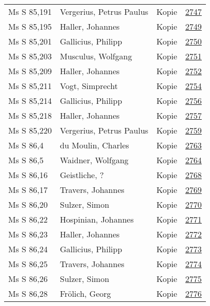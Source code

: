 \documentclass[10pt,a4paper,landscape]{report}
\begin{document}
\begin{longtable}{p{16cm}p{4cm}lr}
Ms S 85,191	&	Vergerius, Petrus Paulus	&	Kopie	&	\href{http://130.60.24.72/assignment/2747}{2747}\\
Ms S 85,195	&	Haller, Johannes	&	Kopie	&	\href{http://130.60.24.72/assignment/2749}{2749}\\
Ms S 85,201	&	Gallicius, Philipp	&	Kopie	&	\href{http://130.60.24.72/assignment/2750}{2750}\\
Ms S 85,203	&	Musculus, Wolfgang	&	Kopie	&	\href{http://130.60.24.72/assignment/2751}{2751}\\
Ms S 85,209	&	Haller, Johannes	&	Kopie	&	\href{http://130.60.24.72/assignment/2752}{2752}\\
Ms S 85,211	&	Vogt, Simprecht	&	Kopie	&	\href{http://130.60.24.72/assignment/2754}{2754}\\
Ms S 85,214	&	Gallicius, Philipp	&	Kopie	&	\href{http://130.60.24.72/assignment/2756}{2756}\\
Ms S 85,218	&	Haller, Johannes	&	Kopie	&	\href{http://130.60.24.72/assignment/2757}{2757}\\
Ms S 85,220	&	Vergerius, Petrus Paulus	&	Kopie	&	\href{http://130.60.24.72/assignment/2759}{2759}\\
Ms S 86,4	&	du Moulin, Charles	&	Kopie	&	\href{http://130.60.24.72/assignment/2763}{2763}\\
Ms S 86,5	&	Waidner, Wolfgang	&	Kopie	&	\href{http://130.60.24.72/assignment/2764}{2764}\\
Ms S 86,16	&	Geistliche, ?	&	Kopie	&	\href{http://130.60.24.72/assignment/2768}{2768}\\
Ms S 86,17	&	Travers, Johannes	&	Kopie	&	\href{http://130.60.24.72/assignment/2769}{2769}\\
Ms S 86,20	&	Sulzer, Simon	&	Kopie	&	\href{http://130.60.24.72/assignment/2770}{2770}\\
Ms S 86,22	&	Hospinian, Johannes	&	Kopie	&	\href{http://130.60.24.72/assignment/2771}{2771}\\
Ms S 86,23	&	Haller, Johannes	&	Kopie	&	\href{http://130.60.24.72/assignment/2772}{2772}\\
Ms S 86,24	&	Gallicius, Philipp	&	Kopie	&	\href{http://130.60.24.72/assignment/2773}{2773}\\
Ms S 86,25	&	Travers, Johannes	&	Kopie	&	\href{http://130.60.24.72/assignment/2774}{2774}\\
Ms S 86,26	&	Sulzer, Simon	&	Kopie	&	\href{http://130.60.24.72/assignment/2775}{2775}\\
Ms S 86,28	&	Frölich, Georg	&	Kopie	&	\href{http://130.60.24.72/assignment/2776}{2776}\\

\end{longtable}
\end{document}
